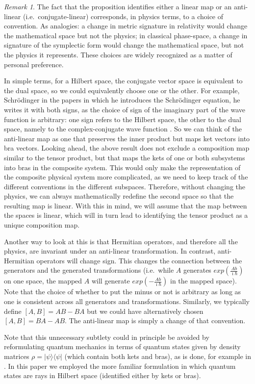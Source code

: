 \documentclass[aps,prl,amsmath,amssymb,twocolumn,nofootinbib]{revtex4}
\theoremstyle{plain}
\theoremstyle{definition}
\theoremstyle{remark}
\newtheorem*{remark}{Remark}
\def\>{\rangle}
\def\<{\langle}
\begin{document}
	\begin{remark}
		The fact that the proposition identifies either a linear map or an anti-linear (i.e.~conjugate-linear) corresponds, in physics terms, to a choice of convention. As analogies: a change in metric signature in relativity would change the mathematical space but not the physics; in classical phase-space, a change in signature of the symplectic form would change the mathematical space, but not the physics it represents. These choices are widely recognized as a matter of personal preference.
		
		In simple terms, for a Hilbert space, the conjugate
                vector space is equivalent to the dual space, so we
                could equivalently choose one or the other. For
                example, Schr\"odinger in the papers in which he
                introduces the Schr\"odinger equation, he writes it
                with both signs, as the choice of sign of the imaginary part of the wave function is arbitrary: one sign refers to
                the Hilbert space, the other to the dual space, namely
                to the complex-conjugate wave function \cite{sch}. So we can think of the anti-linear map as one that preserves the inner product but maps ket vectors into bra vectors. Looking ahead, the above result does not exclude a composition map similar to the tensor product, but that maps the kets of one or both subsystems into bras in the composite system. This would only make the representation of the composite physical system more complicated, as we need to keep track of the different conventions in the different subspaces. Therefore, without changing the physics, we can always mathematically redefine the second space so that the resulting map is linear. With this in mind, we will assume that the map between the spaces is linear, which will in turn lead to identifying the tensor product as a unique composition map.

Another way to look at this is that Hermitian operators, and therefore all 
 the physics, are invariant under an anti-linear transformation.
 In contrast, anti-Hermitian operators will change sign. This 
 changes the connection between the generators and the generated 
 transformations (i.e.~while $A$ generates $exp(\frac{Ab}{\imath\hbar})$ 
 on one space, the mapped $A$ will generate 
 $exp(-\frac{Ab}{\imath\hbar})$ in the mapped space). Note that the 
 choice of whether to put the minus or not is arbitrary as long as one is consistent across all generators and transformations.
 Similarly, we typically define $[A, B] = AB - BA$ but we could have 
 alternatively chosen $[A, B] = BA - AB$. The anti-linear map is simply 
 a change of that convention.

		Note that this unnecessary subtlety could in principle be avoided by
		reformulating quantum mechanics in terms of quantum states given by
		density matrices $\rho=|\psi\>\<\psi|$ (which contain both  kets and
		bras), as is done, for example in \cite{ozawa,holevo}. In this paper
		we employed the more familiar formulation in which quantum states are
		rays in Hilbert space (identified either by kets or bras).
	\end{remark}
	
\end{document}
